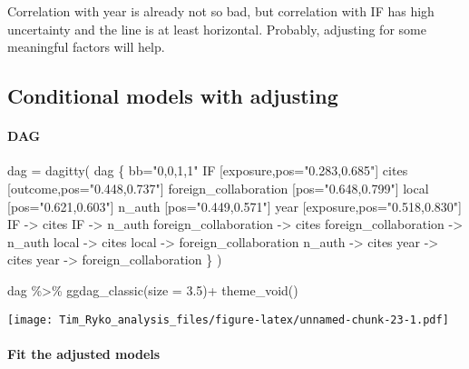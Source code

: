 \documentclass[
]{article}
\newenvironment{Shaded}{\begin{snugshade}}{\end{snugshade}}
\newcommand{\AttributeTok}[1]{\textcolor[rgb]{0.77,0.63,0.00}{#1}}
\newcommand{\FloatTok}[1]{\textcolor[rgb]{0.00,0.00,0.81}{#1}}
\newcommand{\FunctionTok}[1]{\textcolor[rgb]{0.00,0.00,0.00}{#1}}
\newcommand{\NormalTok}[1]{#1}
\newcommand{\OtherTok}[1]{\textcolor[rgb]{0.56,0.35,0.01}{#1}}
\newcommand{\SpecialCharTok}[1]{\textcolor[rgb]{0.00,0.00,0.00}{#1}}
\newcommand{\StringTok}[1]{\textcolor[rgb]{0.31,0.60,0.02}{#1}}
\begin{document}
Correlation with year is already not so bad, but correlation with IF has
high uncertainty and the line is at least horizontal. Probably,
adjusting for some meaningful factors will help.

\hypertarget{conditional-models-with-adjusting}{%
\subsection{Conditional models with
adjusting}\label{conditional-models-with-adjusting}}

\hypertarget{dag}{%
\paragraph{DAG}\label{dag}}

\begin{Shaded}
\begin{Highlighting}[]
\NormalTok{dag }\OtherTok{=} \FunctionTok{dagitty}\NormalTok{(}
  \StringTok{\textquotesingle{}dag \{}
\StringTok{  bb="0,0,1,1"}
\StringTok{  IF [exposure,pos="0.283,0.685"]}
\StringTok{  cites [outcome,pos="0.448,0.737"]}
\StringTok{  foreign\_collaboration [pos="0.648,0.799"]}
\StringTok{  local [pos="0.621,0.603"]}
\StringTok{  n\_auth [pos="0.449,0.571"]}
\StringTok{  year [exposure,pos="0.518,0.830"]}
\StringTok{  IF {-}\textgreater{} cites}
\StringTok{  IF {-}\textgreater{} n\_auth}
\StringTok{  foreign\_collaboration {-}\textgreater{} cites}
\StringTok{  foreign\_collaboration {-}\textgreater{} n\_auth}
\StringTok{  local {-}\textgreater{} cites}
\StringTok{  local {-}\textgreater{} foreign\_collaboration}
\StringTok{  n\_auth {-}\textgreater{} cites}
\StringTok{  year {-}\textgreater{} cites}
\StringTok{  year {-}\textgreater{} foreign\_collaboration}
\StringTok{  \}}
\StringTok{\textquotesingle{}}
\NormalTok{)}

\NormalTok{dag }\SpecialCharTok{\%\textgreater{}\%} 
  \FunctionTok{ggdag\_classic}\NormalTok{(}\AttributeTok{size =} \FloatTok{3.5}\NormalTok{)}\SpecialCharTok{+}
  \FunctionTok{theme\_void}\NormalTok{()}
\end{Highlighting}
\end{Shaded}

\texttt{[image: Tim\_Ryko\_analysis\_files/figure-latex/unnamed-chunk-23-1.pdf]}

\hypertarget{fit-the-adjusted-models}{%
\paragraph{Fit the adjusted models}\label{fit-the-adjusted-models}}
\end{document}
